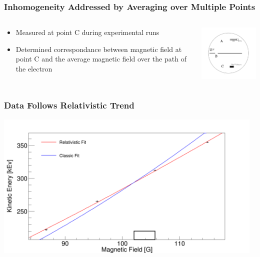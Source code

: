 \documentclass{beamer}
\begin{document}
\begin{frame}
  \frametitle{Inhomogeneity Addressed by Averaging over Multiple Points}
  \begin{columns}
  \begin{column}{0.5\textwidth}
      \begin{itemize}
        \item Measured at point C during experimental runs
        \item Determined correspondance between magnetic field at point C and the average magnetic field over the path of the electron
      \end{itemize}
\end{column}
    \begin{column}{0.5\textwidth}
  \includegraphics[width=6cm]{inhomo.png}
\end{column}
\end{columns}
\end{frame}

\begin{frame}
  \frametitle{Data Follows Relativistic Trend}
  \includegraphics[width=13cm]{sysgraph.png}
\end{frame}
\end{document}
